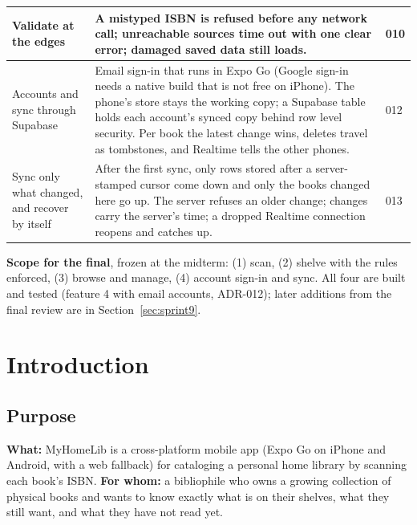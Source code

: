 \documentclass[12pt]{article}
\begin{document}
\begin{small}
\begin{tabular}{|L{4.2cm}|L{9.6cm}|L{1.4cm}|}
\hline
Validate at the edges & A mistyped ISBN is refused before any network call; unreachable sources time out with one clear error; damaged saved data still loads. & 010 \\
\hline
Accounts and sync through Supabase & Email sign-in that runs in Expo Go (Google sign-in needs a native build that is not free on iPhone). The phone's store stays the working copy; a Supabase table holds each account's synced copy behind row level security. Per book the latest change wins, deletes travel as tombstones, and Realtime tells the other phones. & 012 \\
\hline
Sync only what changed, and recover by itself & After the first sync, only rows stored after a server-stamped cursor come down and only the books changed here go up. The server refuses an older change; changes carry the server's time; a dropped Realtime connection reopens and catches up. & 013 \\
\hline
\end{tabular}
\end{small}

\medskip
\noindent\textbf{Scope for the final}, frozen at the midterm: (1) scan, (2) shelve with the rules enforced, (3) browse and manage, (4) account sign-in and sync. All four are built and tested (feature 4 with email accounts, ADR-012); later additions from the final review are in Section~\ref{sec:sprint9}.

\newpage

\section{Introduction}

\subsection{Purpose}

\textbf{What:} MyHomeLib is a cross-platform mobile app (Expo Go on iPhone and Android, with a web fallback) for cataloging a personal home library by scanning each book's ISBN. \textbf{For whom:} a bibliophile who owns a growing collection of physical books and wants to know exactly what is on their shelves, what they still want, and what they have not read yet.
\end{document}
